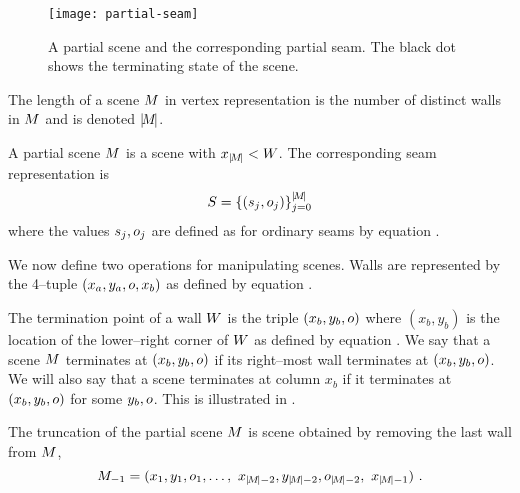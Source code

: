 \begin{figure}[tb]
  \centering
  \texttt{[image: partial-seam]}
  \caption{A partial scene and the corresponding partial seam. The
    black dot shows the terminating state of the scene.}
  \label{fig:partial-seam}
\end{figure}

\begin{definition}
  \label{def:scene-len}
  The length of a scene $\Scene$ in vertex representation
   is the number of distinct walls in $\Scene$ and
  is denoted $\Length{\Scene}$.
\end{definition}

\begin{definition}
  \label{def:partial-scene}
  A partial scene $\PartialScene$ is a scene with
  $x_{\Length{\Scene}}<\Width$. The corresponding seam representation
  is
  \begin{equation}
    \PartialSeam = \{(\seam_j,\WallOrient_j)\}_{j=0}^{\Length{\PartialScene}}
  \end{equation}
  where the values $\seam_j,\WallOrient_j$ are defined as for ordinary
  seams by equation .
\end{definition}

We now define two operations for manipulating scenes. Walls are
represented by the 4--tuple $(x_a,y_a,\WallOrient,x_b)$ as defined by
equation .

\begin{definition}
  The termination point of a wall $\Wall$ is the triple
  $(x_b,y_b,\WallOrient)$ where $(x_b,y_b)$ is the location of the
  lower--right corner of $\Wall$ as defined by equation
  . We say that a scene $\Scene$ terminates at
  $(x_b,y_b,\WallOrient)$ if its right--most wall terminates at
  $(x_b,y_b,\WallOrient)$. We will also say that a scene terminates at
  column $x_b$ if it terminates at $(x_b,y_b,\WallOrient)$ for some
  $y_b,\WallOrient$. This is illustrated in .
\end{definition}

\begin{definition}
  \label{def:truncation}
  The truncation of the partial scene $\PartialScene$ is scene obtained
  by removing the last wall from $\PartialScene$,
  \begin{equation}
    \PartialScene_{-1} = 
    ( x_1,y_1,\WallOrient_1,
    \ldots,
    ~x_{\SceneLen-2},y_{\SceneLen-2},\WallOrient_{\SceneLen-2},
    ~x_{\SceneLen-1} )~.
  \end{equation}
\end{definition}

